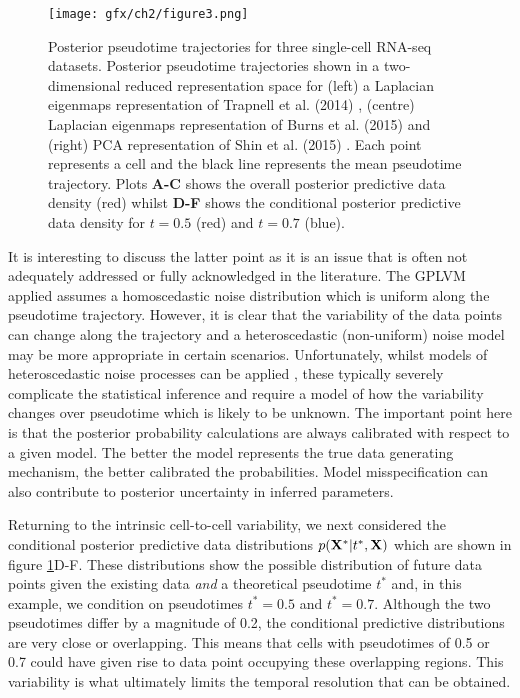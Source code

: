 \begin{figure}
\centering
	\texttt{[image: gfx/ch2/figure3.png]}
  	\caption{Posterior pseudotime trajectories for three single-cell RNA-seq datasets. Posterior pseudotime trajectories shown in a two-dimensional reduced representation space for (left) a Laplacian eigenmaps representation of Trapnell et al. (2014) \cite{Trapnell2014-xi}, (centre) Laplacian eigenmaps representation of Burns et al. (2015) \cite{Burns2015} and (right) PCA representation of Shin et al. (2015) \cite{Shin2015}. Each point represents a cell and the black line represents the mean pseudotime trajectory. Plots \textbf{A-C} shows the overall posterior predictive data density (red) whilst \textbf{D-F} shows the conditional posterior predictive data density for $t = 0.5$ (red) and $t = 0.7$ (blue). }
  	\label{fig:posmean}
\end{figure}

It is interesting to discuss the latter point as it is an issue that is often not adequately addressed or fully acknowledged in the literature. The GPLVM applied assumes a homoscedastic noise distribution which is uniform along the pseudotime trajectory. However, it is clear that the variability of the data points can change along the trajectory and a heteroscedastic (non-uniform) noise model may be more appropriate in certain scenarios. Unfortunately, whilst models of heteroscedastic noise processes can be applied \cite{le2005heteroscedastic}, these typically severely complicate the statistical inference and require a model of how the variability changes over pseudotime which is likely to be unknown. The important point here is that the posterior probability calculations are always calibrated with respect to a given model. The better the model represents the true data generating mechanism, the better calibrated the probabilities. Model misspecification can also contribute to posterior uncertainty in inferred parameters.

Returning to the intrinsic cell-to-cell variability, we next considered the conditional posterior predictive data distributions $p({\bf X}^*|t^*, {\bf X})$ which are shown in figure \ref{fig:posmean}D-F. These distributions show the possible distribution of future data points given the existing data \emph{and} a theoretical pseudotime $t^*$ and, in this example, we condition on pseudotimes $t^* = 0.5$ and $t^* = 0.7$. Although the two pseudotimes differ by a magnitude of 0.2, the conditional predictive distributions are very close or overlapping. This means that cells with pseudotimes of 0.5 or 0.7 could have given rise to data point occupying these overlapping regions. This variability is what ultimately limits the temporal resolution that can be obtained.

